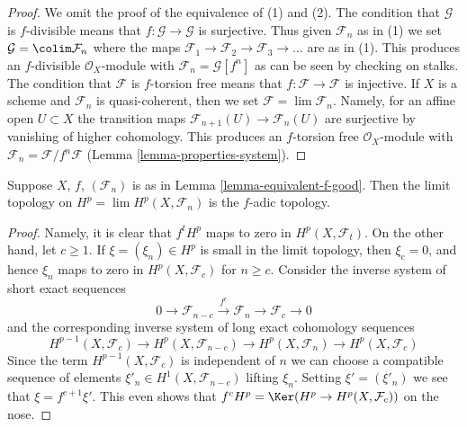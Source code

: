 \begin{proof}
We omit the proof of the equivalence of (1) and (2).
The condition that $\mathcal{G}$ is $f$-divisible means that
$f : \mathcal{G} \to \mathcal{G}$ is surjective.
Thus given $\mathcal{F}_n$ as in (1) we set
$\mathcal{G} = \colim \mathcal{F}_n$ where the maps
$\mathcal{F}_1 \to \mathcal{F}_2 \to \mathcal{F}_3 \to \ldots$
are as in (1). This produces an $f$-divisible $\mathcal{O}_X$-module
with $\mathcal{F}_n = \mathcal{G}[f^n]$ as can be seen by
checking on stalks.
The condition that $\mathcal{F}$ is $f$-torsion free means that
$f : \mathcal{F} \to \mathcal{F}$ is injective.
If $X$ is a scheme and $\mathcal{F}_n$ is quasi-coherent,
then we set $\mathcal{F} = \lim \mathcal{F}_n$. Namely, for an
affine open $U \subset X$ the transition maps
$\mathcal{F}_{n + 1}(U) \to \mathcal{F}_n(U)$ are surjective
by vanishing of higher cohomology. This produces an $f$-torsion free
$\mathcal{O}_X$-module with
$\mathcal{F}_n = \mathcal{F}/f^n\mathcal{F}$
(Lemma \ref{lemma-properties-system}).
\end{proof}

\begin{lemma}
\label{lemma-topology-I-adic-f}
Suppose $X$, $f$, $(\mathcal{F}_n)$ is as in
Lemma \ref{lemma-equivalent-f-good}. Then the limit topology on
$H^p = \lim H^p(X, \mathcal{F}_n)$ is the $f$-adic topology.
\end{lemma}

\begin{proof}
Namely, it is clear that $f^t H^p$ maps to zero in $H^p(X, \mathcal{F}_t)$.
On the other hand, let $c \geq 1$. If $\xi = (\xi_n) \in H^p$ is small in the
limit topology, then $\xi_c = 0$, and hence $\xi_n$
maps to zero in $H^p(X, \mathcal{F}_c)$ for $n \geq c$.
Consider the inverse system of short exact sequences
$$
0 \to \mathcal{F}_{n - c} \xrightarrow{f^c} \mathcal{F}_n \to
\mathcal{F}_c \to 0
$$
and the corresponding inverse system of long exact cohomology sequences
$$
H^{p - 1}(X, \mathcal{F}_c) \to
H^p(X, \mathcal{F}_{n - c}) \to
H^p(X, \mathcal{F}_n) \to
H^p(X, \mathcal{F}_c)
$$
Since the term $H^{p - 1}(X, \mathcal{F}_c)$ is independent of
$n$ we can choose a compatible sequence of elements
$\xi'_n \in H^1(X, \mathcal{F}_{n - c})$
lifting $\xi_n$. Setting $\xi' = (\xi'_n)$ we see that
$\xi = f^{c + 1} \xi'$. This even shows that
$f^c H^p = \Ker(H^p \to H^p(X, \mathcal{F}_c))$ on the nose.
\end{proof}

